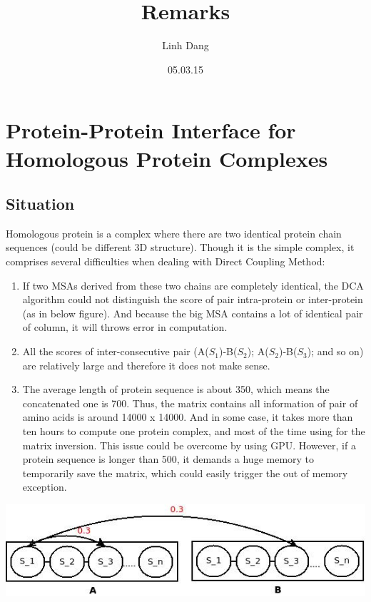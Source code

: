 \documentclass[a4paper,12pt]{article}
\begin{document}
\title{Remarks}
\author{Linh Dang}
\date{05.03.15} 
\maketitle

\section*{Protein-Protein Interface for Homologous Protein Complexes}
\subsection*{Situation}
Homologous protein is a complex where there are two identical protein chain sequences (could be different 3D structure). Though it is the simple complex, it comprises several difficulties when dealing with Direct Coupling Method:
\begin{enumerate}
\item
If two MSAs derived from these two chains are completely identical, the DCA algorithm could not distinguish the score of pair intra-protein or inter-protein (as in below figure). And because the big MSA contains a lot of identical pair of column, it will throws error in computation.
\item
All the scores of inter-consecutive pair (A($ S_1 $)-B($ S_2 $); A($ S_2 $)-B($ S_3 $); and so on) are relatively large and therefore it does not make sense.
\item
The average length of protein sequence is about 350, which means the concatenated one is 700. Thus, the matrix contains all information of pair of amino acids is around 14000 x 14000. And in some case, it takes more than ten hours to compute one protein complex, and most of the time using for the matrix inversion. This issue could be overcome by using GPU. However, if a protein sequence is longer than 500, it demands a huge memory to temporarily save the matrix, which could easily trigger the out of memory exception. 

\end{enumerate}
\includegraphics[width=\textwidth]{HomologousProteinComplex.jpeg}
\end{document}
